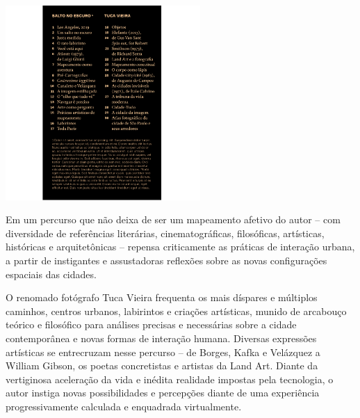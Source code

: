 \vfill

\hspace*{-.4cm}\begin{minipage}[c]{.5\linewidth}
\small{
{}}
\end{minipage}


\pagebreak %

\begin{center}
\hspace*{.5cm}\includegraphics[width=74mm]{./grid/tuca.png}
\end{center}

\hspace*{-7cm}\hrulefill\hspace*{-7cm}

\medskip

\noindent{}Em um percurso que não deixa de ser um mapeamento afetivo do autor – com diversidade de referências literárias, cinematográficas, filosóficas, artísticas, históricas e arquitetônicas – {} repensa criticamente as práticas de interação urbana, a partir de instigantes e assustadoras reflexões sobre as novas configurações espaciais das cidades.

O renomado fotógrafo Tuca Vieira frequenta os mais díspares e múltiplos caminhos, centros urbanos, labirintos e criações artísticas, munido de arcabouço teórico e filosófico para análises precisas e necessárias sobre a cidade contemporânea e novas formas de interação humana. Diversas expressões artísticas se entrecruzam nesse percurso – de Borges, Kafka e Velázquez a William Gibson, os poetas concretistas e artistas da Land Art. Diante da vertiginosa aceleração da vida e inédita realidade impostas pela tecnologia, o autor instiga novas possibilidades e percepções diante de uma experiência progressivamente calculada e enquadrada virtualmente. 

